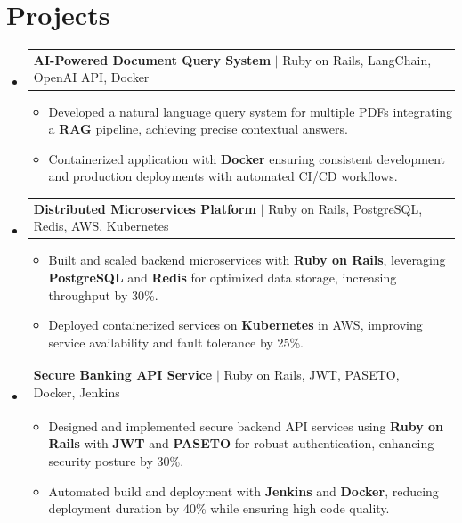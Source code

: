 \documentclass[letterpaper,11pt]{article}
\makeatletter
\newcommand{\resumeItem}[1]{
  \item\footnotesize{
    {#1 \vspace{-2pt}}
  }
}
\newcommand{\resumeProjectHeading}[2]{
    \item
    \begin{tabular*}{1.001\textwidth}{l@{\extracolsep{\fill}}r}
      \small#1 & \textbf{\small #2}\\
    \end{tabular*}\vspace{-7pt}
}
\newcommand{\resumeSubHeadingListStart}{\begin{itemize}[leftmargin=0pt, label={}]}
\newcommand{\resumeSubHeadingListEnd}{\end{itemize}}
\newcommand{\resumeItemListStart}{\begin{itemize}[leftmargin=*]}
\newcommand{\resumeItemListEnd}{\end{itemize}\vspace{-5pt}}
\makeatother
\begin{document}
\section{Projects}
    \vspace{-5pt}
    \resumeSubHeadingListStart

      \resumeProjectHeading
          {\textbf{AI-Powered Document Query System} $|$ Ruby on Rails, LangChain, OpenAI API, Docker}{}
        \resumeItemListStart
            \resumeItem{Developed a natural language query system for multiple PDFs integrating a \textbf{RAG} pipeline, achieving precise contextual answers.}
            \resumeItem{Containerized application with \textbf{Docker} ensuring consistent development and production deployments with automated CI/CD workflows.}
        \resumeItemListEnd
        \vspace{-12pt}

      \resumeProjectHeading
          {\textbf{Distributed Microservices Platform} $|$ Ruby on Rails, PostgreSQL, Redis, AWS, Kubernetes}{}
        \resumeItemListStart
            \resumeItem{Built and scaled backend microservices with \textbf{Ruby on Rails}, leveraging \textbf{PostgreSQL} and \textbf{Redis} for optimized data storage, increasing throughput by 30\%.}
            \resumeItem{Deployed containerized services on \textbf{Kubernetes} in AWS, improving service availability and fault tolerance by 25\%.}
        \resumeItemListEnd
        \vspace{-12pt}

      \resumeProjectHeading
          {\textbf{Secure Banking API Service} $|$ Ruby on Rails, JWT, PASETO, Docker, Jenkins}{}
        \resumeItemListStart
            \resumeItem{Designed and implemented secure backend API services using \textbf{Ruby on Rails} with \textbf{JWT} and \textbf{PASETO} for robust authentication, enhancing security posture by 30\%.}
            \resumeItem{Automated build and deployment with \textbf{Jenkins} and \textbf{Docker}, reducing deployment duration by 40\% while ensuring high code quality.}
        \resumeItemListEnd

    \resumeSubHeadingListEnd
\end{document}
